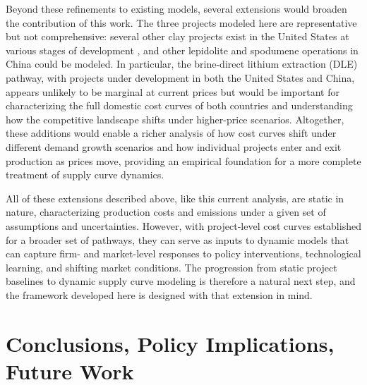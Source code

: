 \documentclass{article}
\renewcommand\_{\textunderscore\allowbreak}
\begin{document}
Beyond these refinements to existing models, several extensions would broaden the contribution of this work. The three projects modeled here are representative but not comprehensive: several other clay projects exist in the United States at various stages of development \citep{wesselkaemperOptimizationProcessingCosts2025}, and other lepidolite and spodumene operations in China could be modeled. In particular, the brine-direct lithium extraction (DLE) pathway, with projects under development in both the United States and China, appears unlikely to be marginal at current prices but would be important for characterizing the full domestic cost curves of both countries and understanding how the competitive landscape shifts under higher-price scenarios. Altogether, these additions would enable a richer analysis of how cost curves shift under different demand growth scenarios and how individual projects enter and exit production as prices move, providing an empirical foundation for a more complete treatment of supply curve dynamics.

All of these extensions described above, like this current analysis, are static in nature, characterizing production costs and emissions under a given set of assumptions and uncertainties. However, with project-level cost curves established for a broader set of pathways, they can serve as inputs to dynamic models that can capture firm- and market-level responses to policy interventions, technological learning, and shifting market conditions. The progression from static project baselines to dynamic supply curve modeling is therefore a natural next step, and the framework developed here is designed with that extension in mind.

\section{Conclusions, Policy Implications, Future Work}
\end{document}
